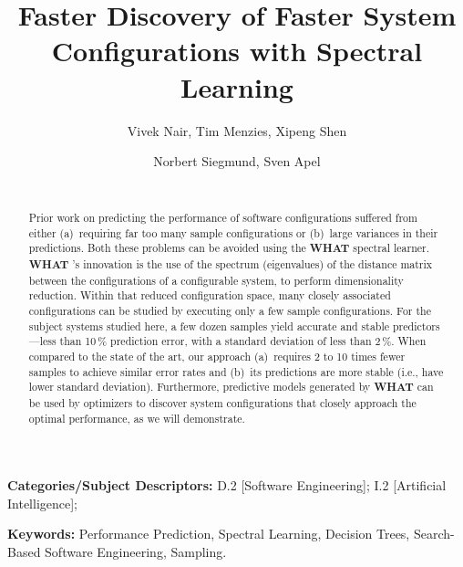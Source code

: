 \documentclass{sig-alternative}
\newcommand{\what}{{\bf WHAT }}
\begin{document}
\title{Faster Discovery of Faster System Configurations with Spectral Learning} 
\author{
        \alignauthor Vivek Nair, Tim Menzies, Xipeng Shen 
        \\
    \and  
        \alignauthor Norbert Siegmund, Sven Apel \\
        \\
       }
\maketitle 
\thispagestyle{plain}
\pagestyle{plain}
\begin{abstract}
Prior work on predicting the performance of software configurations suffered from either (a)~requiring far too many sample configurations or (b)~large variances in their predictions.
Both these problems can be avoided using the \what spectral learner.  
{\what}'s innovation is  
the use of the spectrum (eigenvalues) of the distance matrix
between the configurations of a configurable system, to perform dimensionality reduction. Within that
reduced configuration space, many closely associated configurations can be studied
by executing only a few sample configurations. For the subject systems studied
here, a few dozen samples yield accurate and stable predictors---less than 10\,\% prediction error, with a standard deviation of less than 2\,\%.  
When compared to the state of the art, our approach (a)~requires 
2 to 10 times fewer samples to achieve similar error rates
and (b)~its predictions are  more stable (i.e., have lower standard
deviation). 
Furthermore, predictive models generated by
\what can be used by optimizers to discover system configurations that closely approach the optimal performance, as we will demonstrate.
\end{abstract}

\vspace{1mm}
\noindent
{\bf Categories/Subject Descriptors:} 
D.2 [Software Engineering];
I.2 [Artificial Intelligence];

 
\noindent
{\bf Keywords:} Performance Prediction, 
Spectral Learning, 
Decision Trees,
Search-Based Software Engineering, 
Sampling.
 
\end{document}
